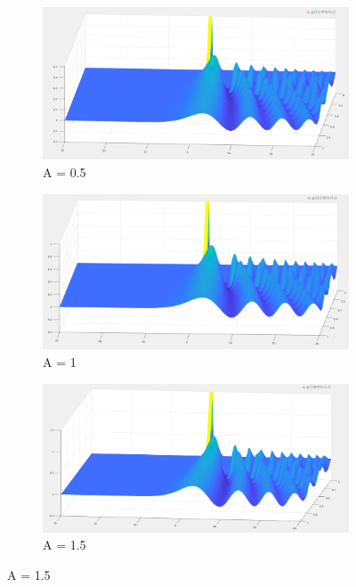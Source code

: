 \documentclass{article}
\begin{document}
\begin{figure}[H]
\centering
\begin{subfigure}[b]{60mm}
\includegraphics[scale=0.1]{figures/infl0p5V.png}
\caption{A = 0.5}
\label{fig:}
\end{subfigure}
\begin{subfigure}[b]{60mm}
\includegraphics[scale=0.1]{figures/infl1V.png}
\caption{A = 1}
\label{fig:}
\end{subfigure}
\begin{subfigure}[b]{60mm}
\includegraphics[scale=0.1]{figures/infl1p5V.png}
\caption{A = 1.5}
\label{fig:}
\end{subfigure}

\end{figure}
\end{document}
